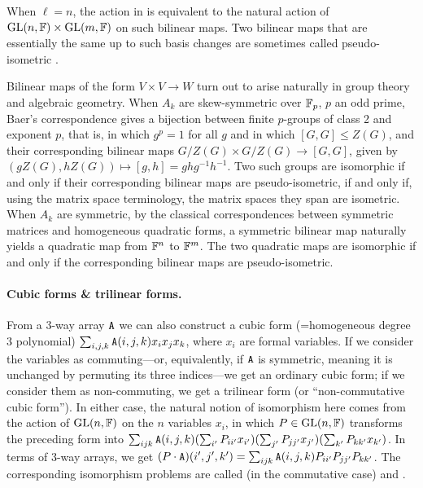 When $\ell=n$, the action in \MatSpIsomlong is equivalent to the natural action of 
$\mathrm{GL}(n, \mathbb{F})\times \mathrm{GL}(m, \mathbb{F})$ on such bilinear maps.
Two bilinear maps that are essentially the same up to such basis changes 
are sometimes called pseudo-isometric \cite{BW12}.

Bilinear maps of the form $V\times V\to W$ turn out to arise naturally in group theory and 
algebraic geometry. When $A_k$ are skew-symmetric over $\mathbb{F}_p$, $p$ an 
odd prime, Baer's correspondence \cite{Bae38} gives a bijection between finite 
$p$-groups 
of class 2 
and exponent $p$, that is, in which $g^p = 1$ for all $g$ and in which $[G, G] 
\leq Z(G)$, and their corresponding bilinear maps $G/Z(G) \times G/Z(G) \to 
[G,G]$, given by $(gZ(G), hZ(G)) \mapsto [g,h]=ghg^{-1}h^{-1}$. Two such groups 
are isomorphic if and only if their corresponding bilinear maps are 
pseudo-isometric, if and only if, using the matrix space terminology, the 
matrix spaces they span are isometric. When $A_k$ are symmetric, by the classical 
correspondences between symmetric matrices and homogeneous quadratic forms, a 
symmetric bilinear map naturally yields a quadratic map from $\mathbb{F}^n$ to $\mathbb{F}^m$. The 
two quadratic maps are isomorphic if and only if the corresponding bilinear 
maps are pseudo-isometric.

\paragraph{Cubic forms \& trilinear forms.}
From a 3-way array 
$\mathtt{A}$ 
we  can also construct a cubic form (=homogeneous degree 3 polynomial) $\sum_{i,j,k} 
\mathtt{A}(i,j,k) x_i x_j x_k$, where $x_i$ are formal variables. 
If we consider the variables as commuting---or, equivalently, if $\mathtt{A}$ is 
symmetric, meaning it is unchanged by permuting its three indices---we get an 
ordinary cubic form; if we consider them as non-commuting, we get a trilinear form 
(or ``non-commutative cubic form''). In either case, 
the natural notion of isomorphism here comes from the 
action of $\mathrm{GL}(n,\mathbb{F})$ on the $n$ variables $x_i$, in which $P \in \mathrm{GL}(n,\mathbb{F})$ transforms 
the preceding form into $\sum_{ijk} \mathtt{A}(i,j,k) (\sum_{i'} P_{ii'} x_{i'})(\sum_{j'} 
P_{jj'} x_{j'})(\sum_{k'} P_{kk'} x_{k'})$. In terms of 3-way arrays, we get $(P 
\cdot \mathtt{A})(i', j', k') = \sum_{ijk} \mathtt{A}(i,j,k) P_{ii'} P_{jj'} P_{kk'}$. The 
corresponding isomorphism 
problems are called \CubicFormlong (in the commutative case) and \NcCubicFormlong.


